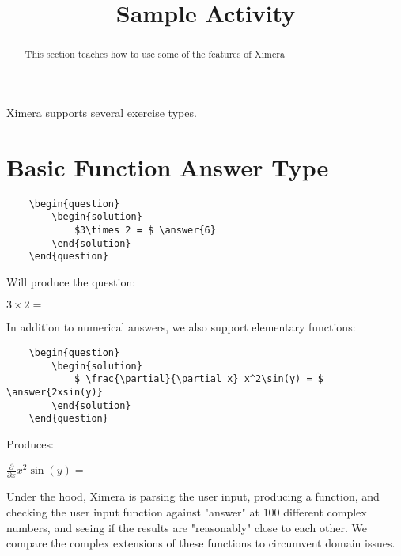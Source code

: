 \documentclass{ximera}
\title{Sample Activity}
\begin{document}
	\begin{abstract}
		This section teaches how to use some of the features of Ximera
	\end{abstract}
	
	Ximera supports several exercise types.
	
	
\section{Basic Function Answer Type}	
\begin{verbatim}
    \begin{question}
        \begin{solution}
            $3\times 2 = $ \answer{6}
        \end{solution}
    \end{question}
\end{verbatim}

Will produce the question:

\begin{question}
        \begin{solution}
            $3\times 2 = $ 
        \end{solution}
\end{question}

In addition to numerical answers, we also support elementary functions:

\begin{verbatim}
    \begin{question}
        \begin{solution}
            $ \frac{\partial}{\partial x} x^2\sin(y) = $ \answer{2xsin(y)}
        \end{solution}
    \end{question}
\end{verbatim}

Produces:

  \begin{question}
        \begin{solution}
            $ \frac{\partial}{\partial x} x^2\sin(y) = $ 
        \end{solution}
    \end{question}
    
Under the hood, Ximera is parsing the user input, producing a function, and checking the user input function against "answer" at 
$100$ different complex numbers, and seeing if the results are "reasonably" close to each other.  
We compare the complex extensions of these functions to circumvent domain issues.
\end{document}
